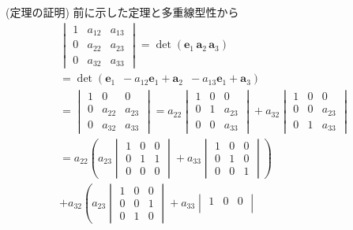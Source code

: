 \documentclass[openany, a4paper, oneside]{jsbook}
\begin{document}
(定理の証明)
前に示した定理と多重線型性から
\begin{gather}
    \begin{vmatrix} 1 & a_{12} & a_{13} \\
                          0 & a_{22} & a_{23} \\
                          0 & a_{32} & a_{33}
    \end{vmatrix}
    =
    \det (\bm{e}_{1} \, \bm{a}_{2} \, \bm{a}_{3} )  \\
    =
    \det (\bm{e}_{1} \,\,\, -a_{12}\bm{e}_{1} + \bm{a}_{2} \,\,\, -a_{13}\bm{e}_{1} + \bm{a}_{3} )\\
    =
    \begin{vmatrix} 1 & 0 & 0 \\
                    0 & a_{22} & a_{23} \\
                    0 & a_{32} & a_{33}
    \end{vmatrix}
    =
    a_{22}\begin{vmatrix} 1 & 0 & 0 \\
                          0 & 1 & a_{23} \\
                          0 & 0 & a_{33}
    \end{vmatrix}
    +a_{32}\begin{vmatrix} 1 & 0 & 0 \\
                            0 & 0 & a_{23} \\
                            0 & 1 & a_{33}
    \end{vmatrix} \\
    =
    a_{22} \left (
    a_{23}\begin{vmatrix} 1 & 0 & 0 \\
                          0 & 1 & 1 \\
                          0 & 0 & 0
    \end{vmatrix}
    +a_{33}\begin{vmatrix} 1 & 0 & 0 \\
                           0 & 1 & 0 \\
                           0 & 0 & 1
    \end{vmatrix}
    \right) \\
    +a_{32}\left (
    a_{23}\begin{vmatrix} 1 & 0 & 0 \\
                          0 & 0 & 1 \\
                          0 & 1 & 0
    \end{vmatrix}
    +a_{33}\begin{vmatrix} 1 & 0 & 0 \\

\end{vmatrix}
\end{gather}
\end{document}
